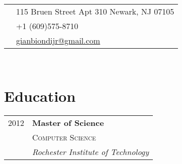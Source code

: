 \documentclass[10pt]{article} %
\begin{document}
{\begin{minipage}[t]{0.5\textwidth}

\end{minipage} %
\hfill
\begin{minipage}[t]{0.44\textwidth} %
\vspace{0pt} %


\colorbox{shade}{\textcolor{text1}{
\begin{tabular}{c|p{7cm}}
\raisebox{-4pt}{\textifsymbol{18}} & 115 Bruen Street Apt 310 Newark, NJ 07105 \\ %
\raisebox{-3pt}{\Mobilefone} & +1 (609)575-8710 \\ %
\raisebox{-1pt}{\Letter} & \href{mailto:gianbiondijr@gmail.com}{gianbiondijr@gmail.com} \\ %
\end{tabular}
}
}\\[10pt]


\section{Education} 

\begin{tabular}{rl} %


2012 & \textbf{Master of Science} \\
& \textsc{Computer Science} \\ 
& \textit{Rochester Institute of Technology}\\
	 

\end{tabular}
\end{minipage}}
\end{document}
